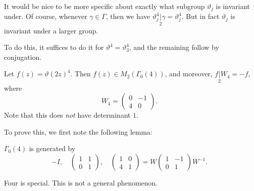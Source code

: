 \documentclass[a4paper]{article}
\begin{document}
It would be nice to be more specific about exactly what subgroup $\vartheta_j$ is invariant under. Of course, whenever $\gamma \in \Gamma$, then we have $\vartheta_j^4 \underset{2}{|}\gamma = \vartheta_j^4$. But in fact $\vartheta_j$ is invariant under a larger group.

To do this, it suffices to do it for $\vartheta^4 = \vartheta_3^4$, and the remaining follow by conjugation.
\begin{thm}
  Let $f(z) = \vartheta(2z)^4$. Then $f(z) \in M_2(\Gamma_0(4))$, and moreover, $f\underset{2}{|}W_4 = -f$, where
  \[
    W_4 = 
    \begin{pmatrix}
      0 & -1\\
      4 & 0
    \end{pmatrix}.
  \]
  Note that this does \emph{not} have determinant $1$.
\end{thm}

To prove this, we first note the following lemma:
\begin{lemma}
  $\Gamma_0(4)$ is generated by
  \[
    -I,\quad
    \begin{pmatrix}
      1 & 1\\0 & 1
    \end{pmatrix},
    \quad
    \begin{pmatrix}
      1 & 0\\
      4 & 1
    \end{pmatrix} =
    W
    \begin{pmatrix}
      1 & -1 \\
      0 & 1
    \end{pmatrix}
    W^{-1}.
  \]
\end{lemma}
Four is special. This is not a general phenomenon.
\end{document}
